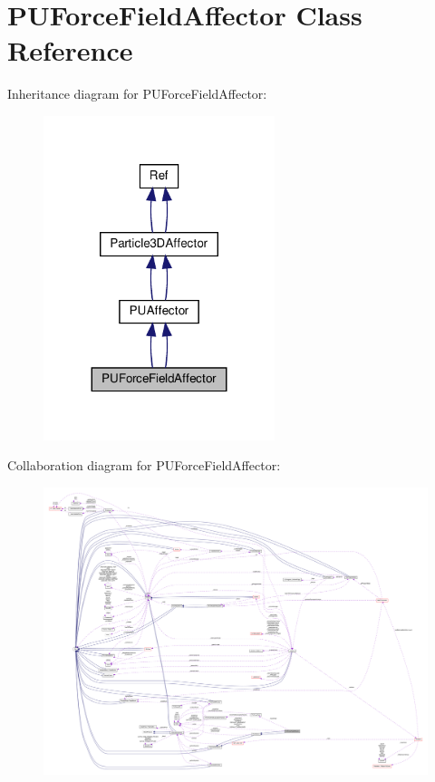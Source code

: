 \hypertarget{classPUForceFieldAffector}{}\section{P\+U\+Force\+Field\+Affector Class Reference}
\label{classPUForceFieldAffector}


Inheritance diagram for P\+U\+Force\+Field\+Affector\+:
\nopagebreak
\begin{figure}[H]
\begin{center}
\leavevmode
\includegraphics[width=191pt]{classPUForceFieldAffector__inherit__graph}
\end{center}
\end{figure}


Collaboration diagram for P\+U\+Force\+Field\+Affector\+:
\nopagebreak
\begin{figure}[H]
\begin{center}
\leavevmode
\includegraphics[width=350pt]{classPUForceFieldAffector__coll__graph}
\end{center}
\end{figure}
